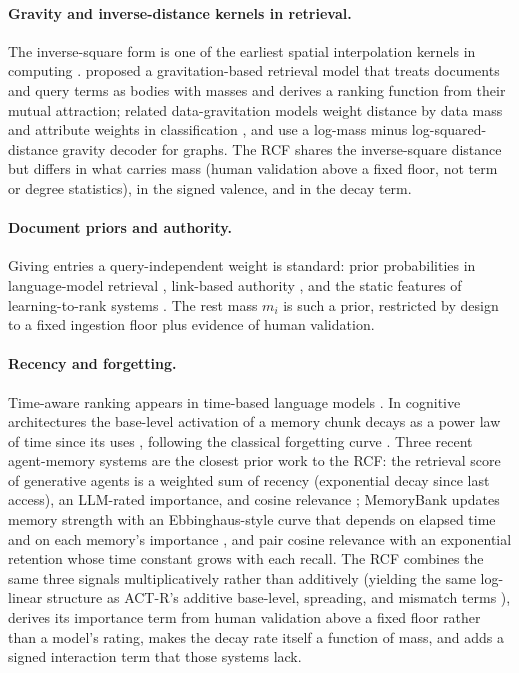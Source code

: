 \documentclass[11pt]{article}
\theoremstyle{remark}
\begin{document}
\paragraph{Gravity and inverse-distance kernels in retrieval.}
The inverse-square form is one of the earliest spatial interpolation kernels in computing \citep{shepard1968two}. \citet{shi2005gravitation} proposed a gravitation-based retrieval model that treats documents and query terms as bodies with masses and derives a ranking function from their mutual attraction; related data-gravitation models weight distance by data mass and attribute weights in classification \citep{peng2005gravitation,peng2009dgc,cano2013dgc}, and \citet{salha2019gravity} use a log-mass minus log-squared-distance gravity decoder for graphs. The RCF shares the inverse-square distance but differs in what carries mass (human validation above a fixed floor, not term or degree statistics), in the signed valence, and in the decay term.

\paragraph{Document priors and authority.}
Giving entries a query-independent weight is standard: prior probabilities in language-model retrieval \citep{kraaij2002importance}, link-based authority \citep{page1999pagerank}, and the static features of learning-to-rank systems \citep{liu2009ltr}. The rest mass $m_i$ is such a prior, restricted by design to a fixed ingestion floor plus evidence of human validation.

\paragraph{Recency and forgetting.}
Time-aware ranking appears in time-based language models \citep{li2003time}. In cognitive architectures the base-level activation of a memory chunk decays as a power law of time since its uses \citep{anderson1991reflections,anderson2004integrated}, following the classical forgetting curve \citep{ebbinghaus1885}. Three recent agent-memory systems are the closest prior work to the RCF: the retrieval score of generative agents is a weighted sum of recency (exponential decay since last access), an LLM-rated importance, and cosine relevance \citep{park2023generative}; MemoryBank updates memory strength with an Ebbinghaus-style curve that depends on elapsed time and on each memory's importance \citep{zhong2024memorybank}, and \citet{hou2024agent} pair cosine relevance with an exponential retention whose time constant grows with each recall. The RCF combines the same three signals multiplicatively rather than additively (yielding the same log-linear structure as ACT-R's additive base-level, spreading, and mismatch terms \citep{anderson2004integrated}), derives its importance term from human validation above a fixed floor rather than a model's rating, makes the decay rate itself a function of mass, and adds a signed interaction term that those systems lack.
\end{document}
